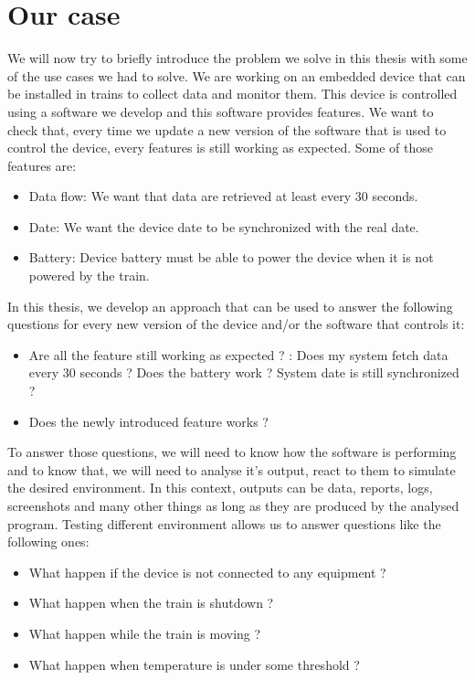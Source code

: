 \documentclass[12pt]{article}
\theoremstyle{definition}
\theoremstyle{definition}
\theoremstyle{remark}
\begin{document}

\section{Our case}
\label{section:ourcase}


We will now try to briefly introduce the problem we solve in this thesis with some of the use cases we had to solve. We are working on an embedded device that can be installed in trains to collect data and monitor them. This device is controlled using a software we develop and this software provides features. We want to check that, every time we update a new version of the software that is used to control the device, every features is still working as expected. Some of those features are:

\begin{itemize}
\item Data flow: We want that data are retrieved at least every 30 seconds.
\item Date: We want the device date to be synchronized with the real date.
\item Battery: Device battery must be able to power the device when it is not powered by the train.
\end{itemize}

In this thesis, we develop an approach that can be used to answer the following questions for every new version of the device and/or the software that controls it:
\begin{itemize}
\item \guillemotleft Are all the feature still working as expected ? \guillemotright: Does my system fetch data every 30 seconds ? Does the battery work ? System date is still synchronized ?
\item \guillemotleft Does the newly introduced feature works ? \guillemotright
\end{itemize}

To answer those questions, we will need to know how the software is performing and to know that, we will need to analyse it's output, react to them to simulate the desired environment. In this context, outputs can be data, reports, logs, screenshots and many other things as long as they are produced by the analysed program. Testing different environment allows us to answer questions like the following ones:
\begin{itemize}
\item What happen if the device is not connected to any equipment ?
\item What happen when the train is shutdown ?
\item What happen while the train is moving ?
\item What happen when temperature is under some threshold ?
\end{itemize}
\end{document}
